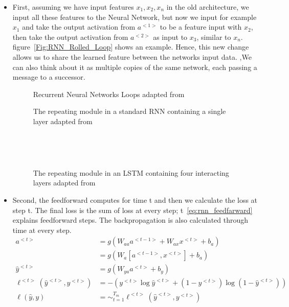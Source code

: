 \begin{itemize}
\item First, assuming we have input features $x_1, x_2, x_n$ in the old architecture, we input all these features to the Neural Network, but now we input for example $x_1$ and take the output activation from $a^{<1>}$ to be a feature input with $x_2$, then take the output activation from $a^{<2>}$ as input to $x_3$, similar to $x_n$. figure~\ref{Fig:RNN_Rolled_Loop} shows an example. Hence, this new change allows us to share the learned feature between the networks input data. ,We can also think about it as multiple copies of the same network, each passing a message to a successor\cite{colah}.%

\begin{figure}[t]
\minipage{\textwidth}
\centering

\endminipage\hfill
\caption{Recurrent Neural Networks Loops adapted from~\cite{colah}}\label{Fig:RNN_Rolled_Loop}

\endminipage\hfill
{}

\endminipage\hfill
{}%

\endminipage
\caption{The repeating module in a standard RNN containing a single layer adapted from~\cite{colah}}~\label{Fig:LSTM_SimpleRNN}


\endminipage\hfill
{}

\endminipage\hfill
{}%

\endminipage
\caption{The repeating module in an LSTM containing four interacting layers adapted from~\cite{colah}}~\label{Fig:LSTM_Cell_Chaining}
\end{figure}%

\item Second, the feedforward computes for time t and then we calculate the loss at step t. The final loss is the sum of loss at every step; t~\eqref{eq:rnn_feedfarward} explains feedforward steps. The backpropagation is also calculated through time at every step.%
\begin{subequations}\label{eq:rnn_feedfarward}
\begin{align}
 a^{<t>} & = g(W_{aa}a^{<t-1>}+ W_{ax}x^{<t>}+b_a)\\
  & = g(W_a[a^{<t-1>},x^{<t>}]+ b_a)\\
 \widehat{y}^{<t>} & = g(W_{ya}a^{<t>}+ b_y)
 \\ \ell^{<t>}(\widehat{y}^{<t>},y^{<t>}) & = - (y^{<t>} \log \widehat{y}^{<t>} + (1-y^{<t>}) \log (1-\widehat{y}^{<t>}))
\\ \ell(\widehat{y},y) & = \sim_{t=1}^{T_m} \ell^{<t>}(\widehat{y}^{<t>},y^{<t>})   
\end{align}
\end{subequations}%
 \end{itemize}


